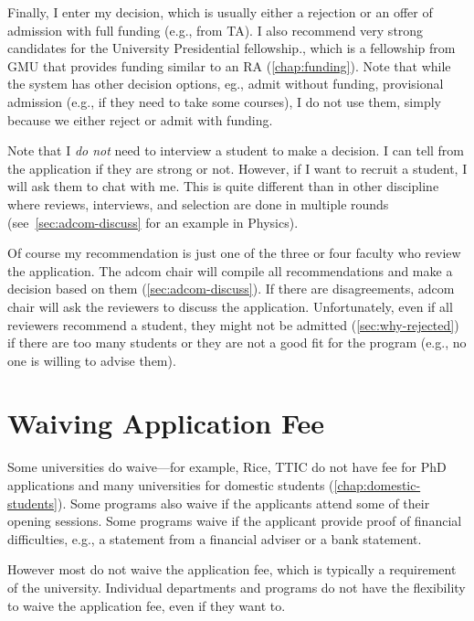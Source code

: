 \documentclass[oneside,11pt]{book}
\begin{document}
Finally, I enter my decision, which is usually either a rejection or an offer of admission with full funding (e.g., from TA). I also recommend very strong candidates for the University Presidential fellowship., which is a fellowship from GMU that provides funding similar to an RA (\autoref{chap:funding}).
Note that while the system has other decision options, eg., admit without funding, provisional admission (e.g., if they need to take some courses), I do not use them, simply because we either reject or admit with funding.

Note that I \emph{do not} need to interview a student to make a decision.  I can tell from the application if they are strong or not. However, if I want to recruit a student, I will ask them to chat with me. 
This is quite different than in other discipline where reviews, interviews, and selection are done in multiple rounds (see~\autoref{sec:adcom-discuss} for an example in Physics).

Of course my recommendation is just one of the three or four faculty who review the application.  The adcom chair will compile all recommendations and make a decision based on them (\autoref{sec:adcom-discuss}).
If there are disagreements, adcom chair will ask the reviewers to discuss the application. 
Unfortunately, even if all reviewers recommend a student, they might not be admitted (\autoref{sec:why-rejected}) if there are too many students or they are not a good fit for the program (e.g., no one is willing to advise them).


\section{Waiving Application Fee}\label{sec:fee-waive}

Some universities do waive---for example, Rice, TTIC do not have fee for PhD applications and many universities for domestic students (\autoref{chap:domestic-students}).
Some programs also waive if the applicants attend some of their opening sessions.  Some programs waive if the applicant provide proof of financial difficulties, e.g., a statement from a financial adviser or a bank statement.

However most do not waive the application fee, which is typically a requirement of the university. Individual departments and programs do not have the flexibility to waive the application fee, even if they want to.
\end{document}
